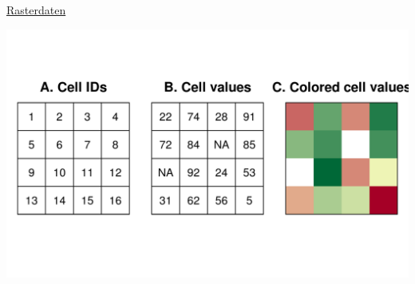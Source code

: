 \documentclass[ignorenonframetext,]{beamer}
\begin{document}
\begin{frame}{\href{https://geocompr.robinlovelace.net/spatial-class.html}{Rasterdaten}}

\includegraphics{figure/raster-intro-plot-1.png}

\end{frame}
\end{document}
